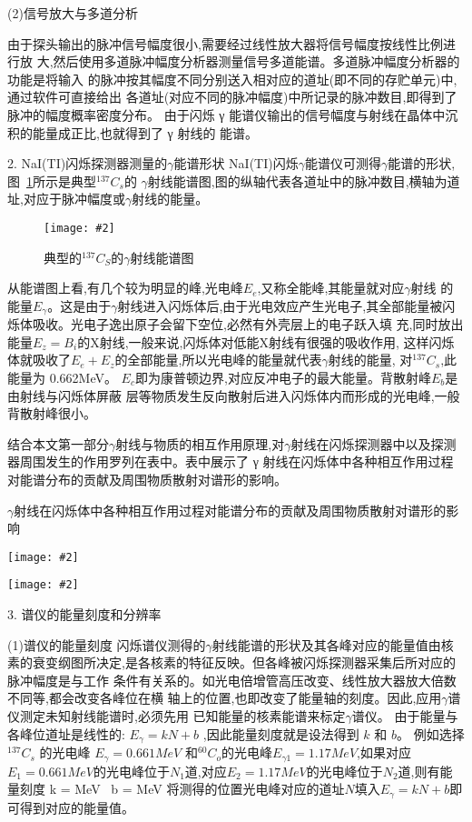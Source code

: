 \documentclass[11pt,a4paper]{ctexart}
\newcommand{\cpic}[2]{
\begin{center}
\texttt{[image: \#2]}
\end{center}
}
\newcommand{\cpicn}[3]
{
\begin{figure}[H]
\cpic{#1}{#2}
\caption{\color{red}#3\label{#2}}
\end{figure}
}
\begin{document}
(2)信号放大与多道分析

由于探头输出的脉冲信号幅度很小,需要经过线性放大器将信号幅度按线性比例进行放
大,然后使用多道脉冲幅度分析器测量信号多道能谱。多道脉冲幅度分析器的功能是将输入
的脉冲按其幅度不同分别送入相对应的道址(即不同的存贮单元)中,通过软件可直接给出
各道址(对应不同的脉冲幅度)中所记录的脉冲数目,即得到了脉冲的幅度概率密度分布。
由于闪烁 γ 能谱仪输出的信号幅度与射线在晶体中沉积的能量成正比,也就得到了 γ 射线的
能谱。

2. NaI(TI)闪烁探测器测量的$\gamma$能谱形状
NaI(TI)闪烁$\gamma$能谱仪可测得$\gamma$能谱的形状,图~\ref{7-4}所示是典型$^{137}C_s$的 $\gamma$射线能谱图,图的纵轴代表各道址中的脉冲数目,横轴为道址,对应于脉冲幅度或$\gamma$射线的能量。
\cpicn{0.5}{7-4}{典型的$^{137}C_S$的$\gamma$射线能谱图}

从能谱图上看,有几个较为明显的峰,光电峰$E_e$,又称全能峰,其能量就对应$\gamma$射线
的能量$E_\gamma$。这是由于$\gamma$射线进入闪烁体后,由于光电效应产生光电子,其全部能量被闪烁体吸收。光电子逸出原子会留下空位,必然有外壳层上的电子跃入填
充,同时放出能量$E_z = B_i$的X射线,一般来说,闪烁体对低能X射线有很强的吸收作用,
这样闪烁体就吸收了$E_e+E_z$的全部能量,所以光电峰的能量就代表$\gamma$射线的能量,
对$^{137}C_s$,此能量为 0.662MeV。
$E_c$即为康普顿边界,对应反冲电子的最大能量。背散射峰$E_b$是由射线与闪烁体屏蔽
层等物质发生反向散射后进入闪烁体内而形成的光电峰,一般背散射峰很小。

结合本文第一部分$\gamma$射线与物质的相互作用原理,对$\gamma$射线在闪烁探测器中以及探测器周围发生的作用罗列在表中。表中展示了 γ 射线在闪烁体中各种相互作用过程对能谱分布的贡献及周围物质散射对谱形的影响。
\begin{table}[H]\label{6-2}
  \caption{$\gamma$射线在闪烁体中各种相互作用过程对能谱分布的贡献及周围物质散射对谱形的影响}
  \cpic{0.4}{6-2-1}
  \cpic{0.4}{6-2-2}
\end{table}

3. 谱仪的能量刻度和分辨率

(1)谱仪的能量刻度
闪烁谱仪测得的$\gamma$射线能谱的形状及其各峰对应的能量值由核素的衰变纲图所决定,是各核素的特征反映。但各峰被闪烁探测器采集后所对应的脉冲幅度是与工作
条件有关系的。如光电倍增管高压改变、线性放大器放大倍数不同等,都会改变各峰位在横
轴上的位置,也即改变了能量轴的刻度。因此,应用$\gamma$谱仪测定未知射线能谱时,必须先用
已知能量的核素能谱来标定$\gamma$谱仪。
由于能量与各峰位道址是线性的: $E_\gamma = kN+b$ ,因此能量刻度就是设法得到 $k$ 和 $b$。
例如选择$^{137}C_s$ 的光电峰 $E_\gamma =0.661 MeV$ 和$^{60}C_o$的光电峰$E_{\gamma 1}=1.17MeV$,如果对应$E_1=0.661 MeV$的光电峰位于$N_1$道,对应$E_2 = 1.17MeV$的光电峰位于$N_2$道,则有能量刻度
\beq
k =  MeV \,\,\,b = MeV
\eeq
将测得的位置光电峰对应的道址$N$填入$E_\gamma = kN+b$即可得到对应的能量值。
\end{document}
